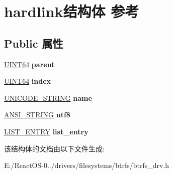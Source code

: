 \hypertarget{structhardlink}{}\section{hardlink结构体 参考}
\label{structhardlink}
\subsection*{Public 属性}
\begin{DoxyCompactItemize}
\item 
\mbox{\label{structhardlink_a5d8234bdb3618ab2091c3a352cfa00cb}} 
\hyperlink{_processor_bind_8h_a57be03562867144161c1bfee95ca8f7c}{U\+I\+N\+T64} {\bfseries parent}
\item 
\mbox{\label{structhardlink_af31b59016408d540ea9a314593e78e0f}} 
\hyperlink{_processor_bind_8h_a57be03562867144161c1bfee95ca8f7c}{U\+I\+N\+T64} {\bfseries index}
\item 
\mbox{\label{structhardlink_a4132d313de623c12fb6deb3d8a84b490}} 
\hyperlink{struct___u_n_i_c_o_d_e___s_t_r_i_n_g}{U\+N\+I\+C\+O\+D\+E\+\_\+\+S\+T\+R\+I\+NG} {\bfseries name}
\item 
\mbox{\label{structhardlink_ab52a98de1ae7c52073580a1152877f6a}} 
\hyperlink{struct___a_n_s_i___s_t_r_i_n_g}{A\+N\+S\+I\+\_\+\+S\+T\+R\+I\+NG} {\bfseries utf8}
\item 
\mbox{\label{structhardlink_a6e22035ed12d62816040c9001189f177}} 
\hyperlink{struct___l_i_s_t___e_n_t_r_y}{L\+I\+S\+T\+\_\+\+E\+N\+T\+RY} {\bfseries list\+\_\+entry}
\end{DoxyCompactItemize}


该结构体的文档由以下文件生成\+:\begin{DoxyCompactItemize}
\item 
E\+:/\+React\+O\+S-\/0../drivers/filesystems/btrfs/btrfs\+\_\+drv.\+h\end{DoxyCompactItemize}
